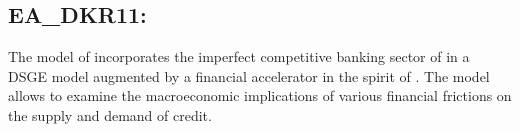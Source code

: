 \documentclass[11pt,a4paper]{article}
\begin{document}
\begin{itemize}
	\end{itemize}
	
	
	\subsection{EA\_DKR11: \cite{DarracqPariesetal2011}}
	\label{EADKR11}
	The model of \cite{DarracqPariesetal2011} incorporates the imperfect competitive banking sector of \cite{Geralietal2010} in a DSGE model augmented by a financial accelerator in the spirit of \cite{BernankeGertlerGilchrist1999}. The model allows to examine the macroeconomic implications of various financial frictions on the supply and demand of credit.
\end{document}
